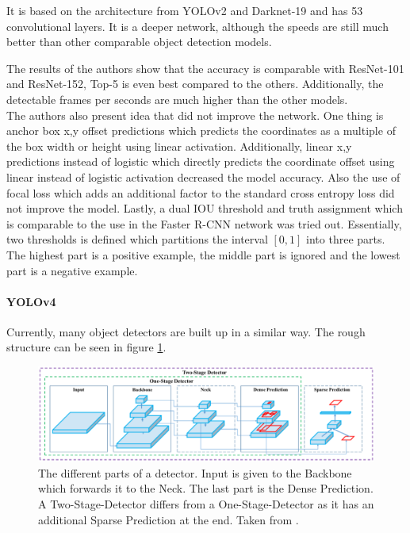 It is based on the architecture from YOLOv2 and Darknet-19 and has 53 convolutional layers. It is a deeper network, although the speeds are still much better than other comparable object detection models. 

The results of the authors show that the accuracy is comparable with ResNet-101 and ResNet-152, Top-5 is even best compared to the others. Additionally, the detectable frames per seconds are much higher than the other models.\\

The authors also present idea that did not improve the network. One thing is anchor box x,y offset predictions which predicts the coordinates as a multiple of the box width or height using linear activation. Additionally, linear x,y predictions instead of logistic which directly predicts the coordinate offset using linear instead of logistic activation decreased the model accuracy. Also the use of focal loss which adds an additional factor to the standard cross entropy loss did not improve the model. Lastly, a dual IOU threshold and truth assignment which is comparable to the use in the Faster R-CNN network was tried out. Essentially, two thresholds is defined which partitions the interval $ [0,1] $ into three parts. The highest part is a positive example, the middle part is ignored and the lowest part is a negative example. 

\paragraph{YOLOv4}

Currently, many object detectors are built up in a similar way. The rough structure can be seen in figure \ref{fig:yolov4_architecture}.

\begin{figure}[htb!]
	\centering
	\includegraphics[scale=0.31]{figures/yolov4_architecture.png}
	\caption{The different parts of a detector. Input is given to the Backbone which forwards it to the Neck. The last part is the Dense Prediction. A Two-Stage-Detector differs from a One-Stage-Detector as it has an additional Sparse Prediction at the end. Taken from \cite{yolov4}.}
	\label{fig:yolov4_architecture}
\end{figure}

